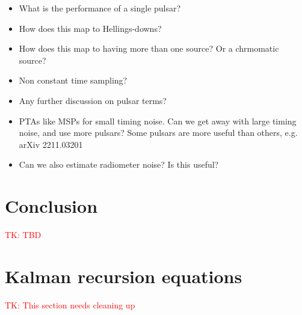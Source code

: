 \documentclass[fleqn,usenatbib,useAMS]{mnras}
\begin{document}
\begin{itemize}
	\item What is the performance of a single pulsar?
	\item How does this map to Hellings-downs?
	\item How does this map to having more than one source? Or a chrmomatic source?
	\item Non constant time sampling?
	\item Any further discussion on pulsar terms?
	\item PTAs like MSPs for small timing noise. Can we get away with large timing noise, and use more pulsars? Some pulsars are more useful than others, e.g. arXiv 2211.03201
	\item Can we also estimate radiometer noise? Is this useful?
\end{itemize}



\section{Conclusion}

\textcolor{red}{TK: TBD}




 \newpage 
\appendix

\section{Kalman recursion equations} \label{sec:kalman}




\textcolor{red}{TK: This section needs cleaning up}
\end{document}

